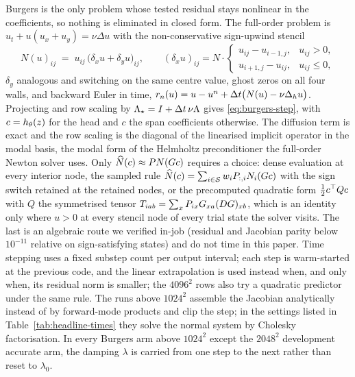 Burgers is the only problem whose tested residual stays nonlinear in the
coefficients, so nothing is eliminated in closed form. The full-order
problem is $u_t+u(u_x+u_y)=\nu\Delta u$ with the non-conservative
sign-upwind stencil
\begin{equation}
  N(u)_{ij} \;=\; u_{ij}\,\big(\delta_x u + \delta_y u\big)_{ij},
  \qquad
  (\delta_x u)_{ij} = N\!\cdot\!
  \begin{cases}
    u_{ij}-u_{i-1,j}, & u_{ij}>0,\\[2pt]
    u_{i+1,j}-u_{ij}, & u_{ij}\le 0,
  \end{cases}
  \label{eq:upwind}
\end{equation}
$\delta_y$ analogous and switching on the same centre value, ghost zeros on all
four walls, and backward Euler in time,
$r_n(u)=u-u^{n}+\Delta t\big(N(u)-\nu\Delta_h u\big)$. Projecting and row
scaling by $\Lambda_\star=I+\Delta t\,\nu\Lambda$ gives \eqref{eq:burgers-step},
with $c=h_\theta(z)$ for the head and $c$ the span coefficients otherwise.
The diffusion term is exact and the row scaling is the diagonal of the
linearised implicit operator in the modal basis, the modal form of the
Helmholtz preconditioner the full-order Newton solver uses. Only
$\widehat{N}(c)\approx P N(G c)$ requires a choice: dense evaluation at
every interior node, the sampled rule
$\widehat{N}(c)=\sum_{i\in\mathcal S}w_iP_{:,i}N_i(G c)$ with the sign
switch retained at the retained nodes, or the precomputed quadratic form
$\tfrac12 c^{\top} Q c$ with $Q$ the symmetrised tensor
$T_{iab}=\sum_xP_{ix}G_{xa}(DG)_{xb}$, which is an identity only where
$u>0$ at every stencil node of every trial state the solver visits. The last is
an algebraic route we verified in-job (residual and Jacobian parity below
$10^{-11}$ relative on sign-satisfying states) and do not time in this paper.
Time stepping uses a fixed substep count per output interval; each step is
warm-started at the previous code, and the linear extrapolation is used instead
when, and only when, its residual norm is smaller; the $4096^2$ rows also try a
quadratic predictor under the same rule. The runs above $1024^2$ assemble
the Jacobian analytically instead of by forward-mode products and clip the
step; in the settings listed in Table~\ref{tab:headline-times} they solve the
normal system by Cholesky factorisation. In every Burgers arm above $1024^2$
except the $2048^2$ development accurate arm, the damping $\lambda$ is carried
from one step to the next rather than reset to $\lambda_0$.

